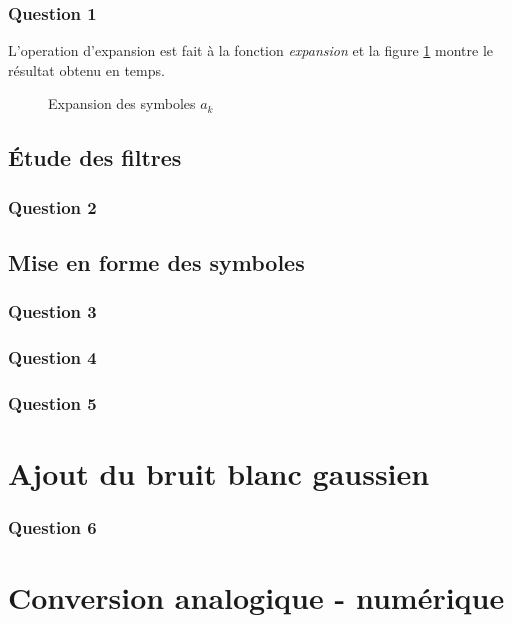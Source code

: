 \documentclass[a4paper,11pt]{article}
\begin{document}
\subsubsection*{Question 1}
L'operation d'expansion est fait à la fonction \emph{expansion} et la figure \ref{fig:ques1} montre le résultat obtenu  en temps.

\begin{figure}[htb]
	\begin{center}
	\caption{Expansion des symboles $a_k$}
	\label{fig:ques1}
	\end{center}
\end{figure} 

\subsection{Étude des filtres}

\subsubsection*{Question 2}

\subsection{Mise en forme des symboles}

\subsubsection*{Question 3}
\subsubsection*{Question 4}
\subsubsection*{Question 5}

\section{Ajout du bruit blanc gaussien}
\subsubsection*{Question 6}

\section{Conversion analogique - numérique}
\end{document}
